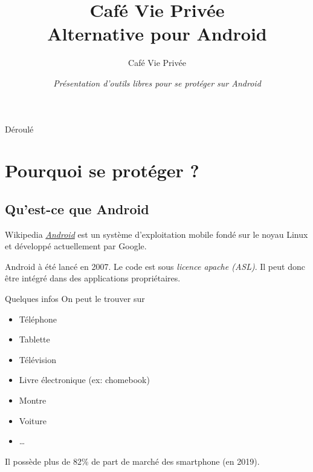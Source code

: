 \documentclass[aspectratio=169]{beamer}
\title[U-Boot]{Café Vie Privée \\ \textbf{Alternative pour Android}}
\author[Café Vie Privée]{Café Vie Privée}
\date[Août 2018]{\textit{Présentation d'outils libres pour se protéger sur Android}}
\begin{document}

\begin{frame}
\titlepage
\end{frame}



\begin{frame}{Déroulé}
\tableofcontents[hideallsubsections]
\end{frame}

\section{Pourquoi se protéger ?}

\begin{frame}
\begin{center}
\huge{\color{cvp}{Pourquoi se protéger ?}}
\end{center}
\end{frame}

\subsection{Qu'est-ce que Android}

\begin{frame}{}
\begin{block}{Wikipedia}
	\emph{\href{https://fr.wikipedia.org/wiki/Android}{Android}} est un système d'exploitation mobile fondé sur le noyau Linux et développé actuellement par Google.
\end{block}
Android à été lancé en 2007.\newline
Le code est sous \emph{licence apache (ASL)}. Il peut donc être intégré dans des applications propriétaires.
\end{frame}

\begin{frame}{Quelques infos}
On peut le trouver sur
\begin{itemize}
	\item Téléphone
	\item Tablette
	\item Télévision
	\item Livre électronique (ex: chomebook)
	\item Montre
	\item Voiture
	\item …
\end{itemize}
Il possède plus de 82\% de part de marché des smartphone (en 2019).
\end{frame}
\end{document}
